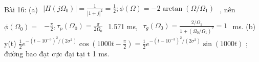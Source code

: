 \documentclass[
  10
]{article}
\begin{document}
Bài 16: (a)
\(\begin{array} { r } { | H ( j \Omega _ { 0 } ) | = \frac { 1 } { | 1 + j | ^ { 2 } } = \frac { 1 } { 2 } ; \phi ( \Omega ) = - 2 \arctan ( \Omega / \Omega _ { 1 } ) } \end{array}\)
, nên \(\phi ( \Omega _ { 0 } ) =\)
\(\begin{array} { r } { - \frac { \pi } { 2 } , \tau _ { p } ( \Omega _ { 0 } ) = \frac { \pi } { 2 \Omega _ { 0 } } } \end{array}\)
1.571 ms,
\(\begin{array} { r } { \tau _ { g } ( \Omega _ { 0 } ) = \frac { 2 / \Omega _ { 1 } } { 1 + ( \Omega _ { 0 } / \Omega _ { 1 } ) ^ { 2 } } = 1 } \end{array}\)
ms. (b) y(t)
\({ \frac { 1 } { 2 } } e ^ { - \left( t - 1 0 ^ { - 3 } \right) ^ { 2 } / \left( 2 \sigma ^ { 2 } \right) } \cos \left( 1 0 0 0 t - { \frac { \pi } { 2 } } \right) = { \frac { 1 } { 2 } } e ^ { - \left( t - 1 0 ^ { - 3 } \right) ^ { 2 } / \left( 2 \sigma ^ { 2 } \right) } \sin ( 1 0 0 0 t )\)
; đường bao  đạt cực đại tại t 1 ms.
\end{document}
